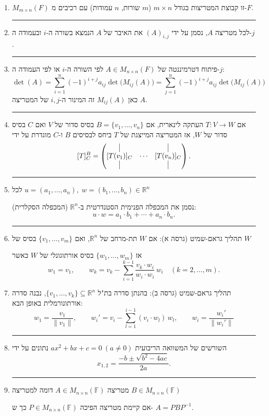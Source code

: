 \documentclass[12pt, a4paper]{article}
\newcommand{\ff}{\mathbb{F}}
\newcommand{\rr}{\mathbb{R}}
\begin{document}
\begin{enumerate}
\item $M_{m\times n}(F)$ זו קבוצת המטריצות בגודל $m\times n$
($m$ שורות, $n$ עמודות)
עם רכיבים מ-$F$.

\noindent\rule{\textwidth-30pt}{0.4pt}

\item לכל מטריצה $A$, נסמן על ידי $(A)_{i,j}$ את האיבר של $A$ הנמצא בשורה ה-$i$ ובעמודה ה-$j$.

\noindent\rule{\textwidth-30pt}{0.4pt}

\item פיתוח דטרמיננטה של $A\in M_{n\times n}(F)$ לפי השורה ה-$i$ או לפי העמודה ה-$j$:
\[
\det(A)=\sum_{i=1}^{n}(-1)^{i+j}a_{ij}\det\!\big(M_{ij}(A)\big)
=\sum_{j=1}^{n}(-1)^{i+j}a_{ij}\det\!\big(M_{ij}(A)\big)
\]
כאן $M_{ij}(A)$ זה המינור ה-$i,j$ של המטריצה $A$.

\noindent\rule{\textwidth-30pt}{0.4pt}

\item אם $T:V\to W$ העתקה לינארית, אם $B=\{v_1,\ldots,v_n\}$ בסיס סדור של $V$ ואם $C$ בסיס סדור של $W$,
אז המטריצה המייצגת של $T$ ביחס לבסיסים $B$ ו-$C$ מוגדרת על ידי
\[
[T]^B_C=
\begin{pmatrix}
\vline & & \vline\\
[T(v_1)]_C & \cdots & [T(v_n)]_C\\
\vline & & \vline
\end{pmatrix}.
\]

\noindent\rule{\textwidth-30pt}{0.4pt}

\item לכל $u=(a_1,\ldots,a_n),\; w=(b_1,\ldots,b_n)\in\mathbb{R}^n$

נסמן את המכפלה הפנימית הסטנדרטית ב-$\mathbb{R}^n$ (המכפלה הסקלרית):
\[
 u\cdot w=a_1\cdot b_1+\cdots+a_n\cdot b_n.
\]

\noindent\rule{\textwidth-30pt}{0.4pt}



\item תהליך גראם-שמיט (גרסה א):
אם $W$ תת-מרחב של $\rr^n$, ואם $\{v_1,\ldots,v_m\}$ בסיס של $W$

אז $\{w_1,\ldots,w_m\}$ בסיס אורתוגונלי של $W$ כאשר
\[
w_1=v_1,\qquad
w_k=v_k-\sum_{i=1}^{k-1}\frac{ v_k\cdot w_i}{ w_i\cdot w_i}\,w_i
\quad (k=2,\ldots,m).
\]
\item תהליך גראם-שמיט (גרסה ב):
בהנתן סדרה בת"ל
$\{v_1,\ldots,v_k\}\subseteq \rr^n$, נבנה סדרה אורתונורמלית באופן הבא:
\[
w_1=\frac{v_1}{\|v_1\|},\qquad
w_i'=v_i-\sum_{l=1}^{i-1} (v_i\cdot w_l)\,w_l,\qquad w_i = \frac{w_i'}{\|w_i'\|}
\]

\noindent\rule{\textwidth-30pt}{0.4pt}

\item השורשים של המשוואה הריבועית
$
ax^2+bx+c=0\ (a\neq 0)
$
נתונים על ידי
\[
x_{1,2}=\frac{-b\pm\sqrt{b^2-4ac}}{2a}.
\]

\noindent\rule{\textwidth-30pt}{0.4pt}

\item מטריצה $A\in M_{n\times n}(\ff)$ דומה למטריצה $B\in M_{n\times n}(\ff)$ 

אם
קיימת 
מטריצה הפיכה
$P\in M_{n\times n}(\ff)$ כך ש-
$A=PBP^{-1}$.
\end{enumerate}
\end{document}
